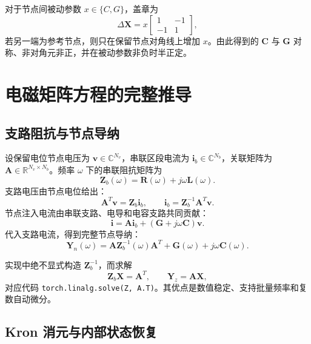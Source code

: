 \documentclass[11pt,a4paper]{ctexart}
\newcommand{\mat}[1]{\bm{#1}}
\newcommand{\code}[1]{\texttt{#1}}
\begin{document}
对于节点间被动参数 \(x\in\{C,G\}\)，盖章为
\[
\Delta \mat X=x
\begin{bmatrix}1&-1\\-1&1\end{bmatrix},
\]
若另一端为参考节点，则只在保留节点对角线上增加 \(x\)。由此得到的 \(\mat C\) 与 \(\mat G\) 对称、非对角元非正，并在被动参数非负时半正定。

\section{电磁矩阵方程的完整推导}

\subsection{支路阻抗与节点导纳}

设保留电位节点电压为 \(\mat v\in\mathbb C^{N_v}\)，串联区段电流为 \(\mat i_b\in\mathbb C^{N_b}\)，关联矩阵为 \(\mat A\in\mathbb R^{N_v\times N_b}\)。频率 \(\omega\) 下的串联阻抗矩阵为
\begin{equation}
\mat Z_b(\omega)=\mat R(\omega)+j\omega\mat L(\omega).
\end{equation}
支路电压由节点电位给出：
\begin{equation}
\mat A^T\mat v=\mat Z_b\mat i_b,
\qquad
\mat i_b=\mat Z_b^{-1}\mat A^T\mat v.
\end{equation}
节点注入电流由串联支路、电导和电容支路共同贡献：
\begin{equation}
\mat i=\mat A\mat i_b+(\mat G+j\omega\mat C)\mat v.
\end{equation}
代入支路电流，得到完整节点导纳：
\begin{equation}
\boxed{\mat Y_n(\omega)=\mat A\mat Z_b^{-1}(\omega)\mat A^T+\mat G(\omega)+j\omega\mat C(\omega).}
\label{eq:ynodal}
\end{equation}

实现中绝不显式构造 \(\mat Z_b^{-1}\)，而求解
\begin{equation}
\mat Z_b\mat X=\mat A^T,
\qquad \mat Y_z=\mat A\mat X,
\end{equation}
对应代码 \code{torch.linalg.solve(Z, A.T)}。其优点是数值稳定、支持批量频率和复数自动微分。

\subsection{Kron 消元与内部状态恢复}
\end{document}
